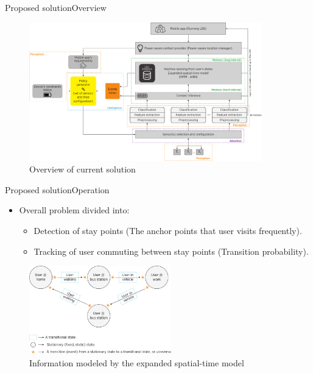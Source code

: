 \documentclass[10pt,xcolor={dvipsnames},handout]{beamer}
\begin{document}
\begin{frame}{Proposed solution}{Overview}
\begin{figure}
  \centering
  \includegraphics[width=0.9\textwidth]{vectors/solution-general-overview}
  \caption{Overview of current solution}
  \label{fig:solution}
\end{figure}
\end{frame}

\begin{frame}{Proposed solution}{Operation}
\begin{itemize}
  \item Overall problem divided into:
  \begin{itemize}
    \item Detection of stay points (The anchor points that user visits frequently).
    \pause
    \item Tracking of user commuting between stay points (Transition probability).
  \end{itemize}
\end{itemize}
\pause
\begin{figure}
  \centering
  \includegraphics[width=0.55\textwidth]{vectors/zoom-expanded-spatial-time-model}
  \caption{Information modeled by the expanded spatial-time model}
  \label{fig:information-modeled-spatial-time-model}
\end{figure}
\end{frame}
\end{document}
